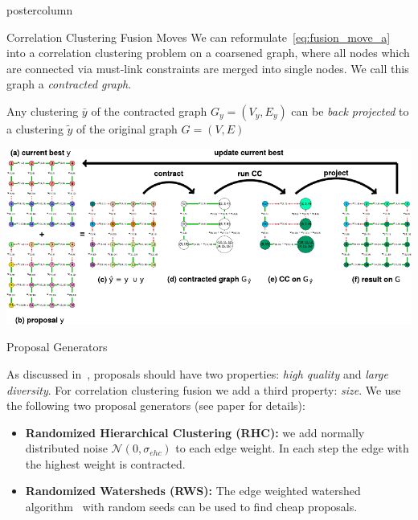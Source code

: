 \documentclass[final,hyperref={pdfpagelabels=false}]{beamer}
\begin{document}
\begin{frame}
\begin{columns}
\begin{column}{.49\textwidth}
\begin{beamercolorbox}[center,wd=\textwidth]{postercolumn}
\begin{minipage}[T]{.95\textwidth}
{\begin{block}{Correlation Clustering Fusion Moves}
              We can reformulate~\ref{eq:fusion_move_a}
              into a correlation clustering problem on a coarsened graph, where all nodes which are connected
              via must-link constraints are merged into single nodes. We call this graph a \emph{contracted graph}.

              Any clustering $\bar{y}$ of the contracted graph $G_y=(V_y,E_y)$ can be \emph{back projected} to a clustering $\tilde{y}$ of the original graph $G=(V,E)$

              \vfill
              \vspace{2cm}
              \centering
              \includegraphics[width=1.0\linewidth]{si-crop.pdf}


            \end{block}
            \vfill
            \begin{block}{Proposal Generators}

            As discussed in~\cite{Lempitsky-2010}, proposals
            should have two properties: \emph{high quality} 
            and \emph{large diversity}.
            For correlation clustering fusion we add a third
            property: \emph{size}.  
            We use the following two proposal generators (see paper for details):
            \begin{itemize}
                \item \textbf{Randomized Hierarchical Clustering (RHC):}
                we add normally distributed noise  $\mathcal{N}(0, \sigma_{ehc})$ to each edge weight.
                In each step the edge with the highest weight is contracted.

                \item \textbf{Randomized Watersheds (RWS):}
                The edge weighted watershed algorithm~\cite{meyer_2013}
                with random seeds can be used to find
                cheap proposals.
            \end{itemize}


\end{block}}
\end{minipage}
\end{beamercolorbox}
\end{column}
\end{columns}
\end{frame}
\end{document}
